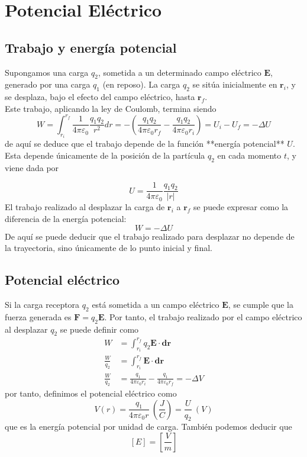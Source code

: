 \documentclass{./FisicaII.tex}
\begin{document}
\chapter{Potencial Eléctrico}
\section{Trabajo y energía potencial}
Supongamos una carga $q_{2}$, sometida a un determinado campo eléctrico $\mathbf{E}$, generado por una carga $q_{1}$ (en reposo). La carga $q_{2}$ se sitúa inicialmente  en $\mathbf{r}_{i}$, y se desplaza, bajo el efecto del campo eléctrico, hasta $\mathbf{r}_{f}$.\\
Este trabajo, aplicando la ley de Coulomb, termina siendo
$$
W=\int_{r_{i}}^{r_{f}} \frac{1}{4\pi\varepsilon_{0}} \frac{q_{1}q_{2}}{r^2}dr = -\left( \frac{q_{1}q_{2}}{4\pi\varepsilon_{0}r_{f}} - \frac{q_{1}q_{2}}{4\pi\varepsilon_{0}r_{i}} \right)=U_{i}-U_{f}=-\Delta U
$$
de aquí se deduce que el trabajo depende de la función **energía potencial** $U$. Esta depende únicamente de la posición de la partícula $q_{2}$ en cada momento $t$, y viene dada por

$$
\boxed{
U=\frac{1}{4\pi\varepsilon_{0}} \frac{q_{1}q_{2}}{|r|}
}
$$
El trabajo realizado al desplazar la carga de $\mathbf{r}_{i}$ a $\mathbf{r}_{f}$ se puede expresar como la diferencia de la energía potencial:
$$
W=-\Delta U
$$
De aquí se puede deducir que el trabajo realizado para desplazar no depende de la trayectoria, sino únicamente de lo punto inicial y final.
\section{Potencial eléctrico}
Si la carga receptora $q_{2}$ está sometida a un campo eléctrico $\mathbf{E}$, se cumple que la fuerza generada es $\mathbf{F}=q_{2}\mathbf{E}$. Por tanto, el trabajo realizado por el campo eléctrico al desplazar $q_{2}$ se puede definir como
\begin{equation}
	\begin{split}
W&=\int_{r_{i}}^{r_{f}}q_{2}\mathbf{E}\cdot \mathbf{dr}\\
\frac{W}{q_{2}} &= \int_{r_{i}}^{r_{f}}\mathbf{E}\cdot \mathbf{dr}\\
\frac{W}{q_{2}}&= \frac{q_{1}}{4\pi\varepsilon_{0}r_{i}}-\frac{q_{1}}{4\pi\varepsilon_{0}r_{f}}=-\Delta V
	\end{split}
\end{equation}
por tanto, definimos el potencial eléctrico como
$$
\boxed{
V(r) = \frac{q_{1}}{4\pi\varepsilon_{0}r}~ \left( \frac{J}{C} \right) = \frac{U}{q_{2}}~(V)
}
$$
que es la energía potencial por unidad de carga. También podemos deducir que
$$
[E]=\left[ \frac{V}{m} \right]
$$
\end{document}
